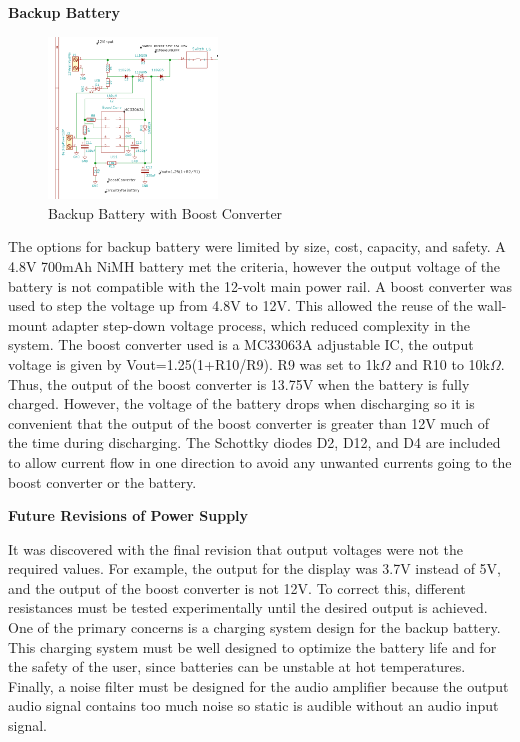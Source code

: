 \documentclass[journal,compsoc]{IEEEtran}
\begin{document}
\textbf {Backup Battery}

\begin{figure}[ht]	%
\centering
\includegraphics[width=0.4\textwidth]{Boost.png}
\caption{Backup Battery with Boost Converter}
\label{Pboost}
\end{figure}

The options for backup battery were limited by size, cost, capacity, and safety.  A 4.8V 700mAh NiMH battery met the criteria, however the output voltage of the battery is not compatible with the 12-volt main power rail.  A boost converter was used to step the voltage up from 4.8V to 12V.  This allowed the reuse of the wall-mount adapter step-down voltage process, which reduced complexity in the system.  The boost converter used is a MC33063A adjustable IC, the output voltage is given by Vout=1.25(1+R10/R9).  R9 was set to 1k$\Omega$ and R10 to 10k$\Omega$.  Thus, the output of the boost converter is 13.75V when the battery is fully charged.  However, the voltage of the battery drops when discharging so it is convenient that the output of the boost converter is greater than 12V much of the time during discharging.  The Schottky diodes D2, D12, and D4 are included to allow current flow in one direction to avoid any unwanted currents going to the boost converter or the battery.


\textbf {Future Revisions of Power Supply}

It was discovered with the final revision that output voltages were not the required values.  For example, the output for the display was 3.7V instead of 5V, and the output of the boost converter is not 12V.  To correct this, different resistances must be tested experimentally until the desired output is achieved.  One of the primary concerns is a charging system design for the backup battery.  This charging system must be well designed to optimize the battery life and for the safety of the user, since batteries can be unstable at hot temperatures.  Finally, a noise filter must be designed for the audio amplifier because the output audio signal contains too much noise so static is audible without an audio input signal.
\end{document}
